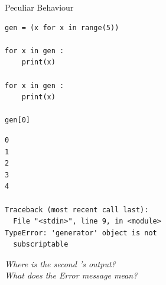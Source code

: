 \begin{frame}[fragile]{Peculiar Behaviour}
%
\begin{tcbraster}[raster columns=2,
                  raster equal height,
                  nobeforeafter,
                  raster column skip=0.5cm]
\begin{codebox}
\begin{verbatim}
gen = (x for x in range(5))

for x in gen :
    print(x)

for x in gen :
    print(x)

gen[0]
\end{verbatim}
\end{codebox}
%
\begin{cmdbox}
\begin{verbatim}
0
1
2
3
4

Traceback (most recent call last):
  File "<stdin>", line 9, in <module>
TypeError: 'generator' object is not
  subscriptable

\end{verbatim}
\end{cmdbox}
\end{tcbraster}
%
\begin{center}
\emph{
	Where is the second 's output?\\
	What does the Error message mean?
}
\end{center}
%
\end{frame}



